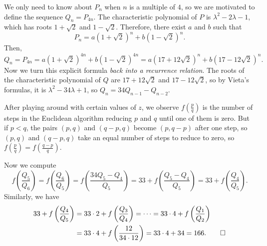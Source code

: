 \documentclass[11pt]{scrartcl}
\begin{document}
\begin{solution}{}
    We only need to know about $P_n$ when $n$ is a multiple of $4$, so we are motivated to define the sequence $Q_n = P_{4n}$. The characteristic polynomial of $P$ is $\lambda^2 - 2\lambda - 1$, which has roots $1 + \sqrt{2}$ and $1 - \sqrt{2}$. Therefore, there exist $a$ and $b$ such that
    \[P_n = a(1 + \sqrt{2})^n + b(1 - \sqrt{2})^n.\]
    Then,
    \[Q_n = P_{4n} = a(1 + \sqrt{2})^{4n} + b(1 - \sqrt{2})^{4n} = a(17 + 12\sqrt{2})^n + b(17 - 12\sqrt{2})^n.\]
    Now we turn this explicit formula \emph{back into a recurrence relation}. The roots of the characteristic polynomial of $Q$ are $17 + 12\sqrt{2}$ and $17 - 12\sqrt{2}$, so by Vieta's formulas, it is $\lambda^2 - 34\lambda + 1$, so $Q_n = 34Q_{n - 1} - Q_{n - 2}$.

    After playing around with certain values of $z$, we observe $f(\frac{p}{q})$ is the number of steps in the Euclidean algorithm reducing $p$ and $q$ until one of them is zero. But if $p < q$, the pairs $(p,q)$ and $(q - p,q)$ become $(p,q - p)$ after one step, so $(p,q)$ and $(q - p,q)$ take an equal number of steps to reduce to zero, so $f(\frac{p}{q}) = f(\frac{q - p}{q})$.
    
    Now we compute
    \[f\left( \frac{Q_5}{Q_6} \right) = f\left( \frac{Q_6}{Q_5} \right) = f\left( \frac{34Q_5 - Q_4}{Q_5} \right) = 33 + f\left( \frac{Q_5 - Q_4}{Q_5} \right) = 33 + f\left( \frac{Q_4}{Q_5} \right).\]
    Similarly, we have
    \begin{align*}
        33 + f\left( \frac{Q_4}{Q_5} \right) &= 33 \cdot 2 + f\left( \frac{Q_3}{Q_4} \right) = \dots = 33 \cdot 4 + f\left( \frac{Q_1}{Q_2} \right) \\\
        &= 33 \cdot 4 + f\left( \frac{12}{34 \cdot 12} \right) = 33 \cdot 4 + 34 = 166. \qedhere
    \end{align*}
\end{solution}
\end{document}
